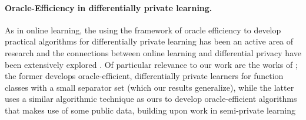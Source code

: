 \paragraph{Oracle-Efficiency in differentially private learning.} 
    As in online learning, the using the framework of oracle efficiency to develop practical algorithms for differentially private learning has been an active area of research \citep{DBLP:conf/focs/Neel0W19,Neel0VW20,vietri2020new, gaboardi2014dual,nikolov2013geometry,block2024oracle} and the connections between online learning and differential privacy have been extensively explored \citep{AlonLMM19,bun2020equivalence,abernethy2019online}.  Of particular relevance to our work are the works of \citet{Neel0VW20,block2024oracle}; the former develops oracle-efficient, differentially private learners for function classes with a small separator set (which our results generalize), while the latter uses a similar algorithmic technique as ours to develop oracle-efficient algorithms that makes use of some public data, building upon work in semi-private learning \cite{beimel2014learning,BassilyMA19}


